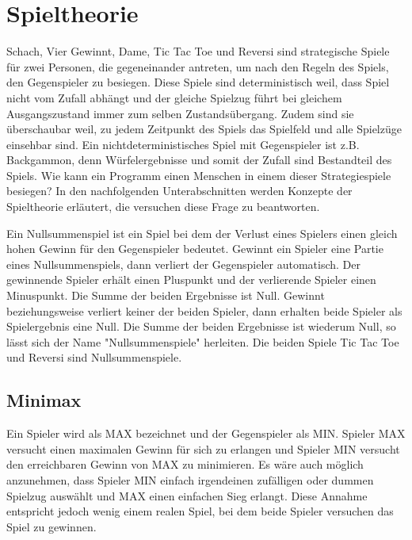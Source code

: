 \section{Spieltheorie}
\label{sec:Spieltheorie}
Schach, Vier Gewinnt, Dame, Tic Tac Toe und Reversi sind strategische Spiele für zwei Personen, die gegeneinander antreten, um nach den Regeln des Spiels, den Gegenspieler zu besiegen. Diese Spiele sind deterministisch weil, dass Spiel nicht vom Zufall abhängt und der gleiche Spielzug führt bei gleichem Ausgangszustand immer zum selben Zustandsübergang. Zudem sind sie überschaubar weil, zu jedem Zeitpunkt des Spiels das Spielfeld und alle Spielzüge einsehbar sind. Ein nichtdeterministisches Spiel mit Gegenspieler ist z.B. Backgammon, denn Würfelergebnisse und somit der Zufall sind Bestandteil des Spiels. Wie kann ein Programm einen Menschen in einem dieser Strategiespiele besiegen? In den nachfolgenden Unterabschnitten werden Konzepte der Spieltheorie erläutert, die versuchen diese Frage zu beantworten.

Ein Nullsummenspiel ist ein Spiel bei dem der Verlust eines Spielers einen gleich hohen Gewinn für den Gegenspieler bedeutet. Gewinnt ein Spieler eine Partie eines Nullsummenspiels, dann verliert der Gegenspieler automatisch. Der gewinnende Spieler erhält einen Pluspunkt und der verlierende Spieler einen Minuspunkt. Die Summe der beiden Ergebnisse ist Null. Gewinnt beziehungsweise verliert keiner der beiden Spieler, dann erhalten beide Spieler als Spielergebnis eine Null. Die Summe der beiden Ergebnisse ist wiederum Null, so lässt sich der Name "Nullsummenspiele" herleiten. Die beiden Spiele Tic Tac Toe und Reversi sind Nullsummenspiele. 

\subsection{Minimax}
\label{subsec:Minimax}
Ein Spieler wird als MAX bezeichnet und der Gegenspieler als MIN. Spieler MAX versucht einen maximalen Gewinn für sich zu erlangen und Spieler MIN versucht den erreichbaren Gewinn von MAX zu minimieren. Es wäre auch möglich anzunehmen, dass Spieler MIN einfach irgendeinen zufälligen oder dummen Spielzug auswählt und MAX einen einfachen Sieg erlangt. Diese Annahme entspricht jedoch wenig einem realen Spiel, bei dem beide Spieler versuchen das Spiel zu gewinnen.\\

